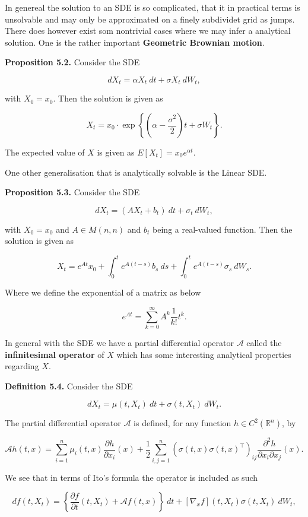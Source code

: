 \documentclass[
]{article}
\begin{document}
In genereal the solution to an SDE is so complicated, that it in
practical terms is unsolvable and may only be approximated on a finely
subdividet grid as jumps. There does however exist som nontrivial cases
where we may infer a analytical solution. One is the rather important
\textbf{Geometric Brownian motion}.

\textbf{Proposition 5.2.} Consider the SDE

\[
dX_t=\alpha X_t\ dt+\sigma X_t\ dW_t,
\]

with \(X_0=x_0\). Then the solution is given as

\[
X_t=x_0\cdot \exp\left\{\left(\alpha- \frac{\sigma^2}{2}\right)t+\sigma W_t\right\}.
\]

The expected value of \(X\) is given as \(E[X_t]=x_0e^{\alpha t}\).

One other generalisation that is analytically solvable is the Linear
SDE.

\textbf{Proposition 5.3.} Consider the SDE

\[
dX_t=(A X_t + b_t)\ dt+ \sigma_t\ dW_t,
\]

with \(X_0=x_0\) and \(A\in M(n,n)\) and \(b_t\) being a real-valued
function. Then the solution is given as

\[
X_t=e^{At}x_0+\int_0^te^{A(t-s)}b_s\ ds+\int_0^te^{A(t-s)}\sigma_s\ dW_s.
\]

Where we define the exponential of a matrix as below

\[
e^{At}=\sum_{k=0}^\infty A^k\frac{1}{k!}t^k.
\]

In general with the SDE we have a partial differential operator
\(\mathcal{A}\) called the \textbf{infinitesimal operator} of \(X\)
which has some interesting analytical properties regarding \(X\).

\textbf{Definition 5.4.} Consider the SDE

\[
dX_t=\mu(t,X_t)\ dt+\sigma(t,X_t)\ dW_t.
\]

The partial differential operator \(\mathcal{A}\) is defined, for any
function \(h\in C^2(\mathbb{R}^n)\), by

\[
\mathcal{A}h(t,x)=\sum_{i=1}^n\mu_i(t,x)\frac{\partial h}{\partial x_i}(x) + \frac{1}{2}\sum_{i,j=1}^n (\sigma(t,x)\sigma(t,x)^\top)_{ij}\frac{\partial^2h}{\partial x_i\partial x_j}(x).
\]

We see that in terms of Ito's formula the operator is included as such

\[
df(t,X_t)=\left\{\frac{\partial f}{\partial t}(t,X_t)+\mathcal{A}f(t,x)\right\}\ dt+[\nabla_xf](t,X_t)\sigma(t,X_t)\ dW_t,
\]
\end{document}
